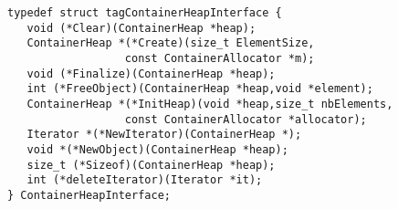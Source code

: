 \begin{verbatim}
typedef struct tagContainerHeapInterface {
   void (*Clear)(ContainerHeap *heap);
   ContainerHeap *(*Create)(size_t ElementSize,
                  const ContainerAllocator *m);
   void (*Finalize)(ContainerHeap *heap);
   int (*FreeObject)(ContainerHeap *heap,void *element);
   ContainerHeap *(*InitHeap)(void *heap,size_t nbElements,
                  const ContainerAllocator *allocator);
   Iterator *(*NewIterator)(ContainerHeap *);
   void *(*NewObject)(ContainerHeap *heap);
   size_t (*Sizeof)(ContainerHeap *heap);
   int (*deleteIterator)(Iterator *it);
} ContainerHeapInterface;
\end{verbatim}

